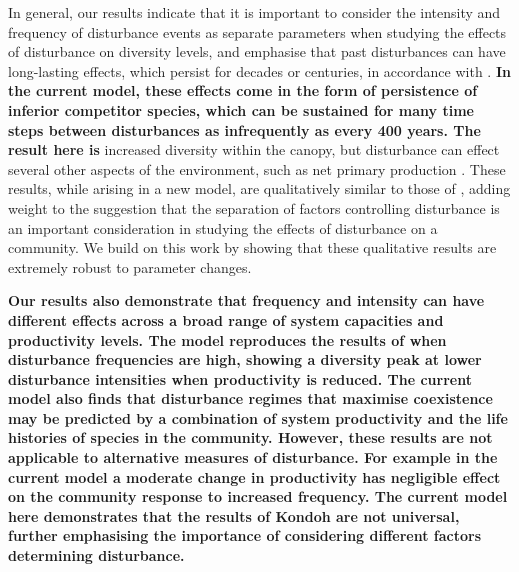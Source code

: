 In general, our results indicate that it is important to consider the intensity and frequency of disturbance events as separate parameters when studying the effects of disturbance on diversity levels, and emphasise that past disturbances can have long-lasting effects, which persist for decades or centuries, in accordance with \cite{foster1999human}. \textbf{In the current model, these effects come in the form of persistence of inferior competitor species, which can be sustained for many time steps between disturbances as infrequently as every 400 years. The result here is} increased diversity within the canopy, but disturbance can effect several other aspects of the environment, such as net primary production \citep[e.g.][]{turner2010disturbance}. These results, while arising in a new model, are qualitatively similar to those of \cite{miller2011frequency}, adding weight to the suggestion that the separation of factors controlling disturbance is an important consideration in studying the effects of disturbance on a community. We build on this work by showing that these qualitative results are extremely robust to parameter changes.

\textbf{Our results also demonstrate that frequency and intensity can have different effects across a broad range of system capacities and productivity levels. The model reproduces the results of \cite{kondoh2001unifying} when disturbance frequencies are high, showing a diversity peak at lower disturbance intensities  when productivity is reduced. The current model also finds that disturbance regimes that maximise coexistence may be predicted by a combination of system productivity and the life histories of species in the community. However, these results are not applicable to alternative measures of disturbance. For example in the current model a moderate change in productivity has negligible effect on the community response to increased frequency. The current model here demonstrates that the results of Kondoh are not universal, further emphasising the importance of considering different factors determining disturbance.}


